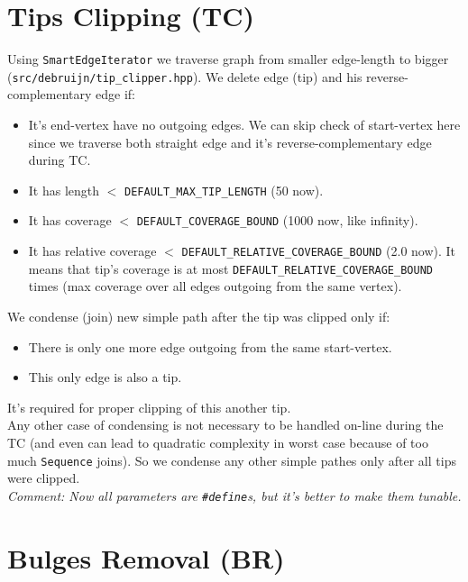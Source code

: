 \documentclass[14pt]{article}
\begin{document}
\section{Tips Clipping (TC)}

Using \texttt{SmartEdgeIterator} we traverse graph from smaller edge-length to bigger (\texttt{src/debruijn/tip\_clipper.hpp}). We delete edge (tip) and his reverse-complementary edge if:
\begin{itemize}
\item It's end-vertex have no outgoing edges. We can skip check of start-vertex here since we traverse both straight edge and it's reverse-complementary edge during TC. 
\item It has length $<$ \texttt{DEFAULT\_MAX\_TIP\_LENGTH} (50 now).
\item It has coverage $<$ \texttt{DEFAULT\_COVERAGE\_BOUND} (1000 now, like infinity).
\item It has relative coverage $<$ \texttt{DEFAULT\_RELATIVE\_COVERAGE\_BOUND} (2.0 now). It means that tip's coverage is at most \texttt{DEFAULT\_RELATIVE\_COVERAGE\_BOUND} times (max coverage over all edges outgoing from the same vertex).
\end{itemize} \vspace{0.5 cm}

We condense (join) new simple path after the tip was clipped only if:
\begin{itemize}
\item There is only one more edge outgoing from the same start-vertex.
\item This only edge is also a tip.
\end{itemize}
It's required for proper clipping of this another tip. \\

Any other case of condensing is not necessary to be handled on-line during the TC (and even can lead to quadratic complexity in worst case because of too much \texttt{Sequence} joins). So we condense any other simple pathes only after all tips were clipped. \\

\textit{Comment: Now all parameters are \texttt{\#define}s, but it's better to make them tunable.}

\section{Bulges Removal (BR)}
\end{document}
